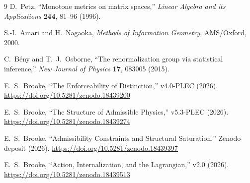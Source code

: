 \documentclass[11pt]{article}
\theoremstyle{remark}
\begin{document}
\begin{thebibliography}{9}
D.\ Petz, ``Monotone metrics on matrix spaces,''
\emph{Linear Algebra and its Applications} \textbf{244}, 81--96 (1996).

S.-I.\ Amari and H.\ Nagaoka, \emph{Methods of Information Geometry}, AMS/Oxford, 2000.

C.\ B\'eny and T.\ J.\ Osborne, ``The renormalization group via statistical inference,''
\emph{New Journal of Physics} \textbf{17}, 083005 (2015).

E.\ S.\ Brooke, ``The Enforceability of Distinction,''
v4.0-PLEC (2026). \url{https://doi.org/10.5281/zenodo.18439200}

E.\ S.\ Brooke, ``The Structure of Admissible Physics,''
v5.3-PLEC (2026). \url{https://doi.org/10.5281/zenodo.18439274}

E.\ S.\ Brooke, ``Admissibility Constraints and Structural Saturation,''
Zenodo deposit (2026). \url{https://doi.org/10.5281/zenodo.18439397}

E.\ S.\ Brooke, ``Action, Internalization, and the Lagrangian,''
v2.0 (2026). \url{https://doi.org/10.5281/zenodo.18439513}

\end{thebibliography}
\end{document}
